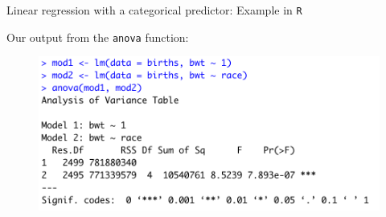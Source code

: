 \documentclass[10pt,t]{beamer}
\begin{document}
\begin{frame}{Linear regression with a categorical predictor: Example in \texttt{R}}

Our output from the \texttt{anova} function:

\vspace{0.3cm}

\begin{figure}
	\centering \includegraphics[scale=0.4]{anova_race.png}
\end{figure}

\end{frame}
\end{document}
